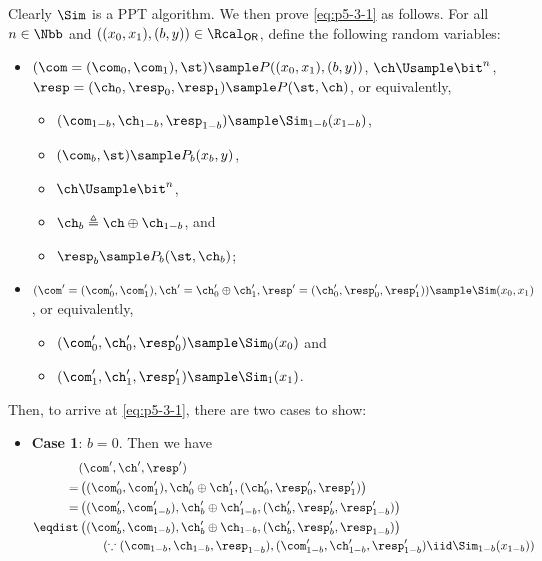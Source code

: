 \begin{answer}
    Clearly $\Sim$ is a PPT algorithm. We then prove \eqref{eq:p5-3-1} as follows. For all $n\in\Nbb$ and $((x_0, x_1), (b, y))\in\Rcal_\mathsf{OR}$, define the following random variables:
    \begin{itemize}
        \item $(\com=(\com_0, \com_1), \st)\sample P((x_0, x_1), (b,y))$, $\ch \Usample \bit^n$, $\resp=(\ch_0, \resp_0, \resp_1) \sample  P(\st, \ch)$, or equivalently,
        \begin{itemize}
            \item $(\com_{1-b}, \ch_{1-b}, \resp_{1-b})\sample \Sim_{1-b}(x_{1-b})$,
            \item $(\com_b, \st)\sample P_b(x_b, y)$,
            \item $\ch \Usample\bit^n$,
            \item $\ch_b \triangleq \ch\oplus \ch_{1-b}$, and
            \item $\resp_b\sample P_b(\st, \ch_b)$;
        \end{itemize}
        \item $(\com'=(\com_0', \com_1'), \ch'=\ch_0'\oplus \ch_1', \resp'=(\ch_0', \resp_0', \resp_1'))\sample \Sim(x_0, x_1)$, or equivalently,
        \begin{itemize}
            \item $(\com_0', \ch_0', \resp_0')\sample \Sim_0(x_0)$ and
            \item $(\com_1', \ch_1', \resp_1')\sample \Sim_1(x_1)$.
        \end{itemize}
    \end{itemize}
    Then, to arrive at \eqref{eq:p5-3-1}, there are two cases to show:
    \begin{itemize}
        \item \textbf{Case 1}: $b=0$. Then we have
        \begin{align*}
            &(\com', \ch', \resp')\\
            =&  \left( (\com_0', \com_1'), \ch_0'\oplus \ch_1', (\ch_0', \resp_0', \resp_1') \right)\\
            =&  \left( (\com_b', \com_{1-b}'), \ch_b'\oplus \ch_{1-b}', (\ch_b', \resp_b', \resp_{1-b}') \right)\\
            \eqdist&  \left( (\com_b', \com_{1-b}), \ch_b'\oplus \ch_{1-b}, (\ch_b', \resp_b', \resp_{1-b}) \right) \\
            &\qquad (\because (\com_{1-b}, \ch_{1-b}, \resp_{1-b}),(\com_{1-b}', \ch_{1-b}', \resp_{1-b}')\iid \Sim_{1-b}(x_{1-b}))\\

\end{align*}
\end{itemize}
\end{answer}
